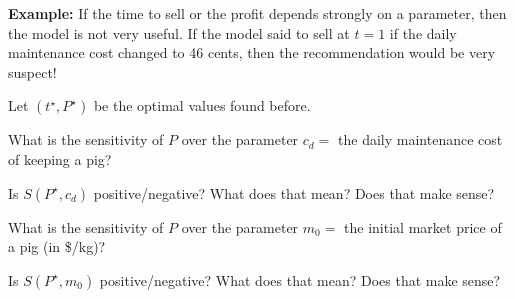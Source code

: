 \documentclass{workbook}
\begin{document}
\begin{slide}


\textbf{Example:} If the time to sell or the profit depends strongly on a parameter, then the model is not very useful.
If the model said to sell at $t=1$ if the daily maintenance cost changed to 46 cents, then the recommendation would be very suspect!

\begin{parts}
\setcounter{partsitem}{4}

	\item Let $(t^\star,P^\star)$ be the optimal values found before. 
	
	What is the sensitivity of $P$ over the parameter $c_d=$ the daily maintenance cost of keeping a pig?
	
	\item Is $S(P^\star,c_d)$ positive/negative? What does that mean? Does that make sense?
	
	\item What is the sensitivity of $P$ over the parameter $m_0=$ the initial market price of a pig (in \$/kg)?

	\item Is $S(P^\star,m_0)$ positive/negative? What does that mean? Does that make sense?

\end{parts}

\end{slide}
\end{document}
